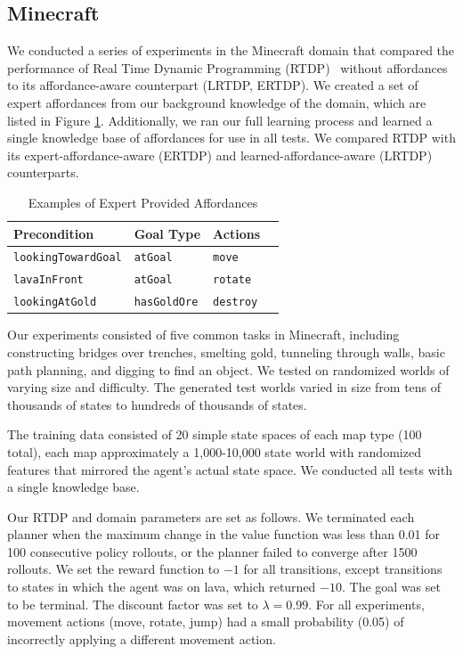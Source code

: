 \documentclass[letterpaper]{article}
\newcommand{\ra}[1]{\renewcommand{\arraystretch}{#1}} %
\begin{document}
\subsection{Minecraft}
We conducted a series of experiments in the Minecraft domain that
compared the performance of Real Time Dynamic Programming (RTDP)~\citep{barto95}
without affordances to its affordance-aware counterpart (LRTDP, ERTDP). We created a set of expert
affordances from our background knowledge of the domain, which are
listed in Figure \ref{fig:afford_kb_exp}. Additionally, we ran our full
learning process and learned a single knowledge base of affordances for use in all tests. We compared
RTDP with its expert-affordance-aware (ERTDP) and learned-affordance-aware (LRTDP)
counterparts.

\begin{table}[b]
\ra{1.4}
\begin{tabular}{@{}llll@{}}\toprule
Precondition & Goal Type & Actions \\ \midrule
\texttt{lookingTowardGoal} & \texttt{atGoal} & \texttt{move} \\
\texttt{lavaInFront} & \texttt{atGoal} & \texttt{rotate} \\
\texttt{lookingAtGold} & \texttt{hasGoldOre} & \texttt{destroy} \\
\bottomrule
\end{tabular}
\label{fig:afford_kb_exp}
\caption{Examples of Expert Provided Affordances}
\end{table}

Our experiments consisted of five common tasks in Minecraft, including
constructing bridges over trenches, smelting gold, tunneling
through walls, basic path planning, and digging to find an object.  We tested on 
randomized worlds of varying size and difficulty. The generated test
worlds varied in size from tens of thousands of states to hundreds of thousands of states.

The training data consisted of 20 simple state spaces of each map type
(100 total), each map approximately a 1,000-10,000 state world with
randomized features that mirrored the agent's actual state space. We conducted all tests
with a single knowledge base.

Our RTDP and domain parameters are set as follows. We terminated each planner
when the maximum change in the value function was less than 0.01 for
100 consecutive policy rollouts, or the planner failed to converge
after 1500 rollouts.  We set the reward function to $-1$ for all
transitions, except transitions to states in which the agent was on
lava, which returned $-10$. The goal was set to be terminal. The
discount factor was set to $\lambda = 0.99$. For all experiments,
movement actions (move, rotate, jump) had a small probability (0.05)
of incorrectly applying a different movement action.
\end{document}

